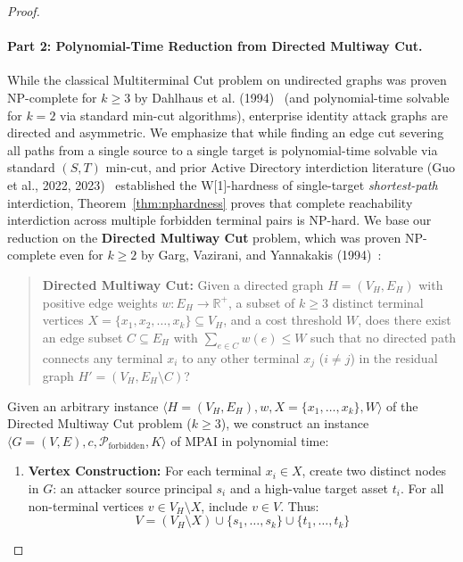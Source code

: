 \begin{proof}
\paragraph{Part 2: Polynomial-Time Reduction from Directed Multiway Cut.}
While the classical Multiterminal Cut problem on undirected graphs was proven NP-complete for $k \ge 3$ by Dahlhaus et al. (1994)~\cite{dahlhaus1994multiterminal} (and polynomial-time solvable for $k=2$ via standard min-cut algorithms), enterprise identity attack graphs are directed and asymmetric. We emphasize that while finding an edge cut severing all paths from a single source to a single target is polynomial-time solvable via standard $(S, T)$ min-cut, and prior Active Directory interdiction literature (Guo et al., 2022, 2023)~\cite{guo2022practical,guo2023scalable} established the W[1]-hardness of single-target \textit{shortest-path} interdiction, Theorem~\ref{thm:nphardness} proves that complete reachability interdiction across multiple forbidden terminal pairs is NP-hard. We base our reduction on the \textbf{Directed Multiway Cut} problem, which was proven NP-complete even for $k \ge 2$ by Garg, Vazirani, and Yannakakis (1994)~\cite{garg1994multiway}:
\begin{quote}
\textbf{Directed Multiway Cut:} Given a directed graph $H = (V_H, E_H)$ with positive edge weights $w: E_H \to \mathbb{R}^+$, a subset of $k \ge 3$ distinct terminal vertices $X = \{x_1, x_2, \dots, x_k\} \subseteq V_H$, and a cost threshold $W$, does there exist an edge subset $C \subseteq E_H$ with $\sum_{e \in C} w(e) \le W$ such that no directed path connects any terminal $x_i$ to any other terminal $x_j$ ($i \neq j$) in the residual graph $H' = (V_H, E_H \setminus C)$?
\end{quote}

Given an arbitrary instance $\langle H = (V_H, E_H), w, X = \{x_1, \dots, x_k\}, W \rangle$ of the Directed Multiway Cut problem ($k \ge 3$), we construct an instance $\langle G = (V, E), c, \mathcal{P}_{\text{forbidden}}, K \rangle$ of MPAI in polynomial time:

\begin{enumerate}
    \item \textbf{Vertex Construction:} For each terminal $x_i \in X$, create two distinct nodes in $G$: an attacker source principal $s_i$ and a high-value target asset $t_i$. For all non-terminal vertices $v \in V_H \setminus X$, include $v \in V$. Thus:
    \begin{equation}
    V = (V_H \setminus X) \cup \{s_1, \dots, s_k\} \cup \{t_1, \dots, t_k\}
    \end{equation}


\end{enumerate}
\end{proof}
